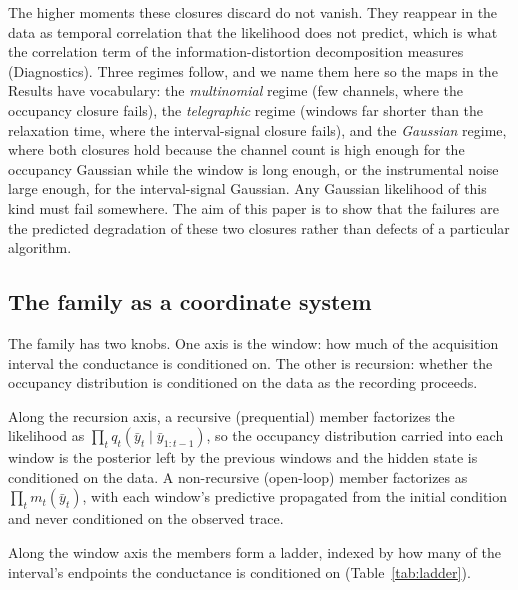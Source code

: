 The higher moments these closures discard do not vanish. They reappear in the data as
temporal correlation that the likelihood does not predict, which is what the correlation
term of the information-distortion decomposition measures (Diagnostics). Three regimes
follow, and we name them here so the maps in the Results have vocabulary: the
\emph{multinomial} regime (few channels, where the occupancy closure fails), the
\emph{telegraphic} regime (windows far shorter than the relaxation time, where the
interval-signal closure fails), and the \emph{Gaussian} regime, where both closures hold
because the channel count is high enough for the occupancy Gaussian while the window is long
enough, or the instrumental noise large enough, for the interval-signal Gaussian. Any Gaussian likelihood of this
kind must fail somewhere. The aim of this paper is to show that the failures are the
predicted degradation of these two closures rather than defects of a particular algorithm.

\subsection*{The family as a coordinate system}

The family has two knobs. One axis is the window: how much of the acquisition interval the
conductance is conditioned on. The other is recursion: whether the occupancy distribution
is conditioned on the data as the recording proceeds.

Along the recursion axis, a recursive (prequential) member factorizes the likelihood as
$\prod_t q_t(\bar{y}_t \mid \bar{y}_{1:t-1})$, so the occupancy distribution carried into
each window is the posterior left by the previous windows and the hidden state is
conditioned on the data. A non-recursive (open-loop) member factorizes as
$\prod_t m_t(\bar{y}_t)$, with each window's predictive propagated from the initial
condition and never conditioned on the observed trace.

Along the window axis the members form a ladder, indexed by how many of the interval's
endpoints the conductance is conditioned on (Table~\ref{tab:ladder}).

